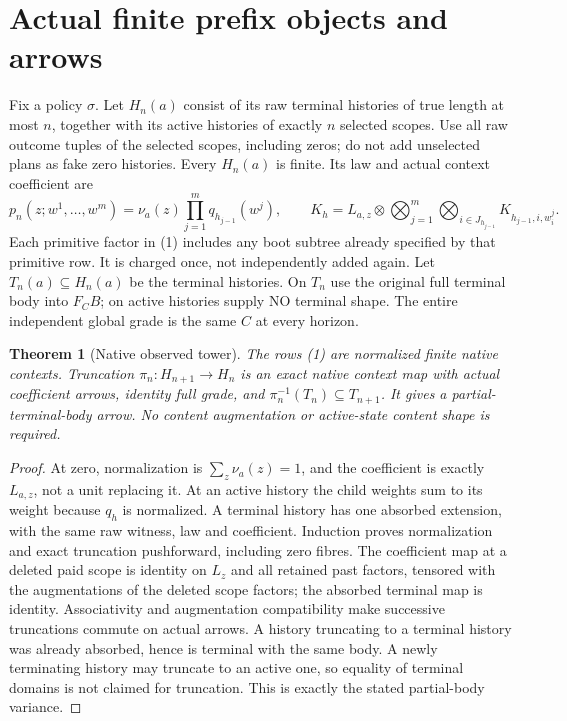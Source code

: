 \documentclass[11pt]{article}
\newtheorem{theorem}{Theorem}\newtheorem{definition}{Definition}
\begin{document}
\section{Actual finite prefix objects and arrows}
Fix a policy $\sigma$. Let $H_n(a)$ consist of its raw terminal histories
of true length at most $n$, together with its active histories of exactly
$n$ selected scopes. Use all raw outcome tuples of the selected scopes,
including zeros; do not add unselected plans as fake zero histories.
Every $H_n(a)$ is finite. Its law and actual context coefficient are
\[
 p_n(z;w^1,\ldots,w^m)=\nu_a(z)\prod_{j=1}^m q_{h_{j-1}}(w^j),
 \qquad
 K_h=L_{a,z}\otimes\bigotimes_{j=1}^m\bigotimes_{i\in J_{h_{j-1}}}
 K_{h_{j-1},i,w_i^j}.                                    \tag{1}
\]
Each primitive factor in (1) includes any boot subtree already specified by
that primitive row. It is charged once, not independently added again.
Let $T_n(a)\subseteq H_n(a)$ be the terminal histories. On $T_n$ use the
original full terminal body into $F_C B$; on active histories supply NO
terminal shape. The entire independent global grade is the same $C$ at
every horizon.

\begin{theorem}[Native observed tower]
The rows (1) are normalized finite native contexts. Truncation
$\pi_n:H_{n+1}\to H_n$ is an exact native context map with actual coefficient
arrows, identity full grade, and
$\pi_n^{-1}(T_n)\subseteq T_{n+1}$. It gives a partial-terminal-body arrow.
No content augmentation or active-state content shape is required.
\end{theorem}
\begin{proof}
At zero, normalization is $\sum_z\nu_a(z)=1$, and the coefficient is exactly
$L_{a,z}$, not a unit replacing it. At an active history the child weights
sum to its weight because $q_h$ is normalized. A terminal history has one
absorbed extension, with the same raw witness, law and coefficient. Induction
proves normalization and exact truncation pushforward, including zero fibres.
The coefficient map at a deleted paid scope is identity on $L_z$ and all
retained past factors, tensored with the augmentations of the deleted scope
factors; the absorbed terminal map is identity. Associativity and augmentation
compatibility make successive truncations commute on actual arrows.
A history truncating to a terminal history was already absorbed, hence is
terminal with the same body. A newly terminating history may truncate to an
active one, so equality of terminal domains is not claimed for truncation.
This is exactly the stated partial-body variance.
\end{proof}
\end{document}
